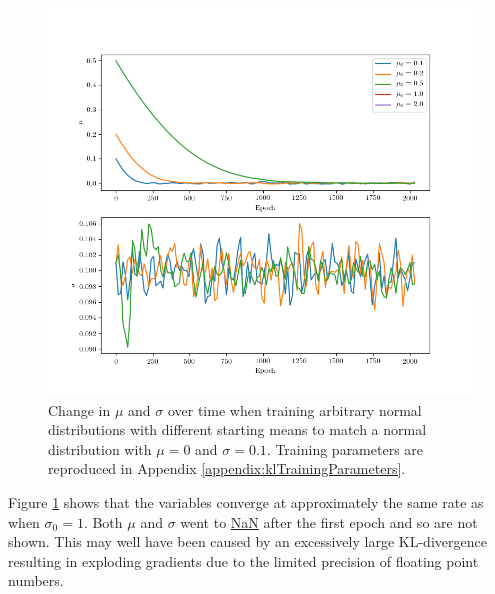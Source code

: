 \documentclass[../../main.tex]{subfiles}
\begin{document}
\begin{figure}[H]
    \begin{center}
    \includegraphics[width=\textwidth]{narrowKLDivergence}
    \caption{
        Change in $\mu$ and $\sigma$ over time when training arbitrary normal distributions with different starting means to match a normal distribution with $\mu=0$ and $\sigma=0.1$. 
        Training parameters are reproduced in Appendix \ref{appendix:klTrainingParameters}.
    }
    \label{fig:narrowKLDivergence}
    \end{center}
\end{figure}
Figure \ref{fig:narrowKLDivergence} shows that the variables converge at approximately the same rate as when $\sigma_0=1$.
Both $\mu$ and $\sigma$ went to \url{NaN} after the first epoch and so are not shown.
This may well have been caused by an excessively large KL-divergence resulting in exploding gradients due to the limited precision of floating point numbers.
\end{document}
